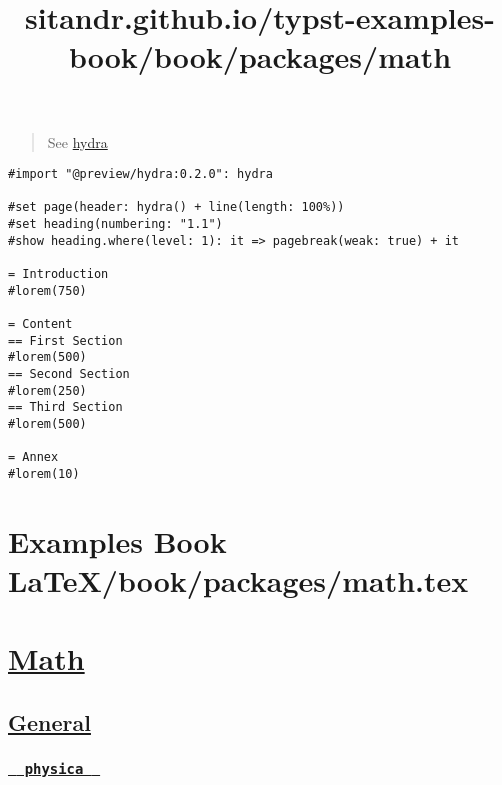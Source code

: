 \begin{quote}
See \href{https://github.com/tingerrr/hydra}{hydra}
\end{quote}

\begin{verbatim}
#import "@preview/hydra:0.2.0": hydra

#set page(header: hydra() + line(length: 100%))
#set heading(numbering: "1.1")
#show heading.where(level: 1): it => pagebreak(weak: true) + it

= Introduction
#lorem(750)

= Content
== First Section
#lorem(500)
== Second Section
#lorem(250)
== Third Section
#lorem(500)

= Annex
#lorem(10)
\end{verbatim}

\pandocbounded{}

\pandocbounded{}

\pandocbounded{}

\pandocbounded{}

\pandocbounded{}


\section{Examples Book LaTeX/book/packages/math.tex}
\title{sitandr.github.io/typst-examples-book/book/packages/math}

\section{\texorpdfstring{\hyperref[math]{Math}}{Math}}\label{math}

\subsection{\texorpdfstring{\hyperref[general]{General}}{General}}\label{general}

\subsubsection{\texorpdfstring{\hyperref[physica]{\texttt{\ }{\texttt{\ physica\ }}\texttt{\ }}}{  physica  }}\label{physica}

